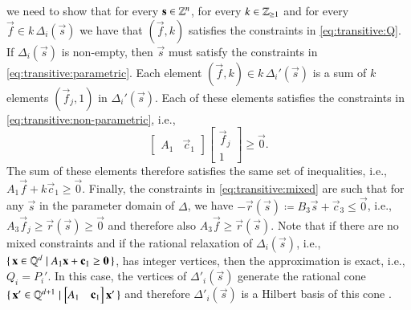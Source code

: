 we need to show that for every $\vec s \in \Z^n$, for every
$k \in \mathbb{Z}_{\ge 1}$ and for every $\vec f \in k \, \Delta_i(\vec s)$
we have that
$(\vec f, k)$ satisfies the constraints in \eqref{eq:transitive:Q}.
If $\Delta_i(\vec s)$ is non-empty, then $\vec s$ must satisfy
the constraints in \eqref{eq:transitive:parametric}.
Each element $(\vec f, k) \in k \, \Delta_i'(\vec s)$ is a sum
of $k$ elements $(\vec f_j, 1)$ in $\Delta_i'(\vec s)$.
Each of these elements satisfies the constraints in
\eqref{eq:transitive:non-parametric}, i.e.,
$$
\left[
\begin{matrix}
A_1 & \vec c_1
\end{matrix}
\right]
\left[
\begin{matrix}
\vec f_j \\ 1
\end{matrix}
\right]
\ge \vec 0
.
$$
The sum of these elements therefore satisfies the same set of inequalities,
i.e., $A_1 \vec f + k \vec c_1 \geq \vec 0$.
Finally, the constraints in \eqref{eq:transitive:mixed} are such
that for any $\vec s$ in the parameter domain of $\Delta$,
we have $-\vec r(\vec s) \coloneqq B_3 \vec s + \vec c_3 \le \vec 0$,
i.e., $A_3 \vec f_j \ge \vec r(\vec s) \ge \vec 0$
and therefore also $A_3 \vec f \ge \vec r(\vec s)$.
Note that if there are no mixed constraints and if the
rational relaxation of $\Delta_i(\vec s)$, i.e.,
$\{\, \vec x \in \Q^d \mid A_1 \vec x + \vec c_1 \ge \vec 0\,\}$,
has integer vertices, then the approximation is exact, i.e.,
$Q_i = P_i'$.  In this case, the vertices of $\Delta'_i(\vec s)$
generate the rational cone
$\{\, \vec x' \in \Q^{d+1} \mid \left[
\begin{matrix}
A_1 & \vec c_1
\end{matrix}
\right] \vec x' \,\}$ and therefore $\Delta'_i(\vec s)$ is
a Hilbert basis of this cone \parencite[Theorem~16.4]{Schrijver1986}.

